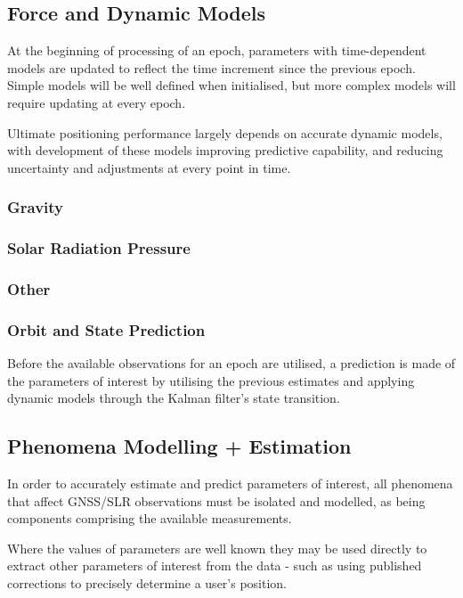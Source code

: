 \subsection{Force and Dynamic Models}

At the beginning of processing of an epoch, parameters with time-dependent models are updated to reflect the time increment since the previous epoch. Simple models will be well defined when initialised, but more complex models will require updating at every epoch.

Ultimate positioning performance largely depends on accurate dynamic models, with development of these models improving predictive capability, and reducing uncertainty and adjustments at every point in time.

\subsubsection{Gravity}
\subsubsection{Solar Radiation Pressure}
\subsubsection{Other}
\subsubsection{Orbit and State Prediction}

Before the available observations for an epoch are utilised, a prediction is made of the parameters of interest by utilising the previous estimates and applying dynamic models through the Kalman filter’s state transition.


\subsection{Phenomena Modelling + Estimation}

In order to accurately estimate and predict parameters of interest, all phenomena that affect GNSS/SLR observations must be isolated and modelled, as being components comprising the available measurements.

Where the values of parameters are well known they may be used directly to extract other parameters of interest from the data - such as using published corrections to precisely determine a user’s position.

